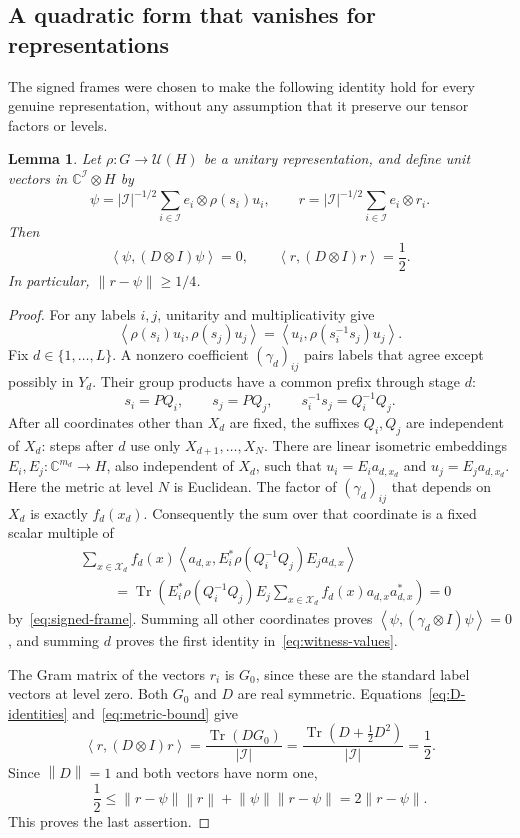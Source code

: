 \documentclass[11pt]{article}
\numberwithin{equation}{section}
\newtheorem{lemma}[theorem]{Lemma}
\theoremstyle{definition}
\theoremstyle{remark}
\newcommand{\norm}[1]{\left\lVert#1\right\rVert}
\newcommand{\abs}[1]{\left\lvert#1\right\rvert}
\newcommand{\ip}[2]{\left\langle#1,#2\right\rangle}
\newcommand{\tr}{\operatorname{Tr}}
\newcommand{\U}{\mathcal U}
\newcommand{\cX}{\mathcal X}
\newcommand{\cI}{\mathcal I}
\begin{document}
\subsection{A quadratic form that vanishes for representations}
The signed frames were chosen to make the following identity hold for
every genuine representation, without any assumption that it preserve
our tensor factors or levels.

\begin{lemma}\label{lem:witness}
Let $\rho:G\to\U(H)$ be a unitary representation, and define unit vectors
in $\mathbb C^{\cI}\otimes H$ by
\[
 \psi=\abs{\cI}^{-1/2}\sum_{i\in\cI}e_i\otimes\rho(s_i)u_i,
 \qquad
 r=\abs{\cI}^{-1/2}\sum_{i\in\cI}e_i\otimes r_i.
\]
Then
\begin{equation}\label{eq:witness-values}
 \ip{\psi}{(D\otimes I)\psi}=0,
 \qquad \ip{r}{(D\otimes I)r}=\frac12.
\end{equation}
In particular, $\norm{r-\psi}\ge1/4$.
\end{lemma}

\begin{proof}
For any labels $i,j$, unitarity and multiplicativity give
\[
 \ip{\rho(s_i)u_i}{\rho(s_j)u_j}
 =\ip{u_i}{\rho(s_i^{-1}s_j)u_j}.
\]
Fix $d\in\{1,\ldots,L\}$. A nonzero coefficient $(\gamma_d)_{ij}$
pairs labels that agree except possibly in $Y_d$. Their group products
have a common prefix through stage $d$:
\[
 s_i=P Q_i,\qquad s_j=P Q_j,
 \qquad s_i^{-1}s_j=Q_i^{-1}Q_j.
\]
After all coordinates other than $X_d$ are fixed, the suffixes $Q_i,Q_j$
are independent of $X_d$: steps after $d$ use only $X_{d+1},\ldots,X_N$.
There are linear isometric embeddings $E_i,E_j:\mathbb C^{m_d}\to H$,
also independent of $X_d$, such that
$u_i=E_i a_{d,x_d}$ and $u_j=E_j a_{d,x_d}$. Here the metric at level
$N$ is Euclidean. The factor of $(\gamma_d)_{ij}$ that depends on $X_d$
is exactly $f_d(x_d)$. Consequently the sum over that coordinate is a
fixed scalar multiple of
\begin{align*}
 &\sum_{x\in\cX_d} f_d(x)
   \ip{a_{d,x}}{E_i^*\rho(Q_i^{-1}Q_j)E_j a_{d,x}}\\
 &\hspace{1cm}=
 \tr\left(E_i^*\rho(Q_i^{-1}Q_j)E_j
        \sum_{x\in\cX_d}f_d(x)a_{d,x}a_{d,x}^*\right)=0
\end{align*}
by~\eqref{eq:signed-frame}. Summing all other coordinates proves
$\ip{\psi}{(\gamma_d\otimes I)\psi}=0$, and summing $d$ proves the
first identity in~\eqref{eq:witness-values}.

The Gram matrix of the vectors $r_i$ is $G_0$, since these are the standard
label vectors at level zero. Both $G_0$ and $D$ are real symmetric.
Equations~\eqref{eq:D-identities} and~\eqref{eq:metric-bound} give
\[
 \ip{r}{(D\otimes I)r}
 =\frac{\tr(DG_0)}{\abs{\cI}}
 =\frac{\tr(D+\frac12D^2)}{\abs{\cI}}=\frac12.
\]
Since $\norm D=1$ and both vectors have norm one,
\[
 \frac12
 \le \norm{r-\psi}\norm r+\norm\psi\norm{r-\psi}
 =2\norm{r-\psi}.
\]
This proves the last assertion.
\end{proof}
\end{document}
